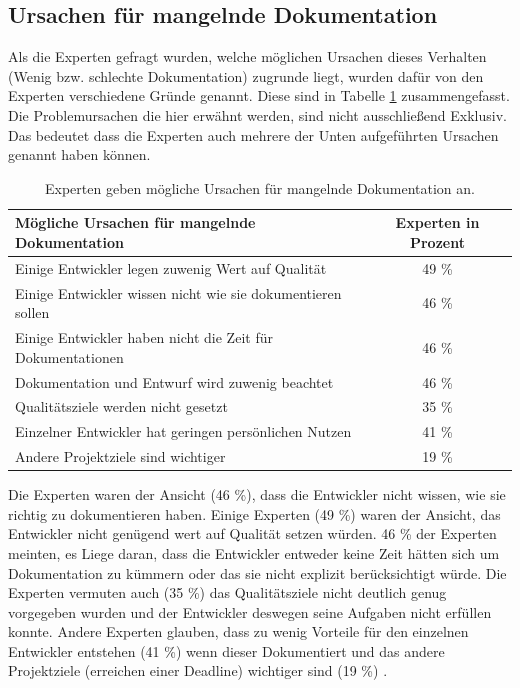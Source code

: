\documentclass[a4paper,12pt]{scrartcl}
\begin{document}
\subsection{Ursachen für mangelnde Dokumentation}
Als die Experten gefragt wurden, welche möglichen Ursachen dieses Verhalten (Wenig bzw. schlechte Dokumentation) zugrunde liegt, wurden dafür von den Experten verschiedene Gründe genannt. Diese sind in Tabelle \ref{UrsachenTabelle} zusammengefasst. Die Problemursachen die hier erwähnt werden, sind nicht ausschließend Exklusiv. Das bedeutet dass die Experten auch mehrere der Unten aufgeführten Ursachen genannt haben können.
\begin{table}[htb]
\begin{tabular}{|l|c|}\hline
\rule{0pt}{15pt}\textbf{Mögliche Ursachen für mangelnde Dokumentation}  & \textbf{Experten in Prozent}
\\
\hline
\rule{0pt}{15pt} Einige Entwickler legen zuwenig Wert auf Qualität & 49 \% \\ 
\hline
\rule{0pt}{15pt} Einige Entwickler wissen nicht wie sie dokumentieren sollen & 46 \%\\
\hline
\rule{0pt}{15pt} Einige Entwickler haben nicht die Zeit für Dokumentationen & 46 \%\\
\hline
\rule{0pt}{15pt} Dokumentation und Entwurf wird zuwenig beachtet & 46 \%\\
\hline
\rule{0pt}{15pt} Qualitätsziele werden nicht gesetzt & 35 \%\\
\hline
\rule{0pt}{15pt} Einzelner Entwickler hat geringen persönlichen Nutzen & 41 \%\\
\hline
\rule{0pt}{15pt} Andere Projektziele sind wichtiger & 19 \%\\
\hline
\end{tabular}
\caption{Experten geben mögliche Ursachen für mangelnde Dokumentation an.}
\label{UrsachenTabelle}
\end{table}
Die Experten waren der Ansicht (46 \%), dass die Entwickler nicht wissen, wie sie richtig zu dokumentieren haben. Einige Experten (49 \%) waren der Ansicht, das Entwickler nicht genügend wert auf Qualität setzen würden. 46 \% der Experten meinten, es Liege daran, dass die Entwickler entweder keine Zeit hätten sich um Dokumentation zu kümmern oder das sie nicht explizit berücksichtigt würde. Die Experten vermuten auch (35 \%) das Qualitätsziele nicht deutlich genug vorgegeben wurden und der Entwickler deswegen seine Aufgaben nicht erfüllen konnte. Andere Experten glauben, dass zu wenig Vorteile für den einzelnen Entwickler entstehen (41 \%) wenn dieser Dokumentiert und das andere Projektziele (erreichen einer Deadline) wichtiger sind (19 \%) \cite{Prause2012}.
\end{document}
